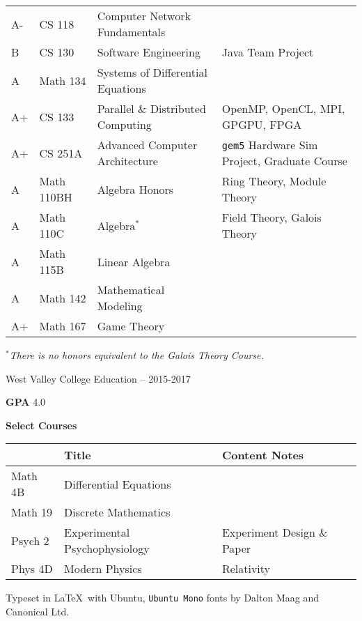 \documentclass[11pt]{article}
\newcommand{\myTitle}[1]{{ \vspace{2mm} \LARGE \color{titleColor} \textsf{#1}\vspace{2mm}}}
\newcommand{\myKey}[1]{{\color{keyColor}\textbf{#1}}}
\begin{document}
{\begin{tabular}{l l l l}
\rowcolor{oddColor}
A- & CS 118 & Computer Network Fundamentals & \\
\rowcolor{oddColor}
B  & CS 130 & Software Engineering & Java Team Project \\
\rowcolor{oddColor}
A  & Math 134 & Systems of Differential Equations & \\

\rowcolor{evenColor}
A+ & CS 133 & Parallel \& Distributed Computing & OpenMP, OpenCL, MPI, GPGPU, FPGA \\
\rowcolor{evenColor}
A+ & CS 251A & Advanced Computer Architecture & \texttt{gem5} Hardware Sim Project, Graduate Course \\
\rowcolor{evenColor}
A  & Math 110BH & Algebra Honors & Ring Theory, Module Theory \\

\rowcolor{oddColor}
A  & Math 110C & Algebra\( ^* \) & Field Theory, Galois Theory \\
\rowcolor{oddColor}
A  & Math 115B & Linear Algebra & \\

\rowcolor{evenColor}
A & Math 142 & Mathematical Modeling & \\
\rowcolor{evenColor}
A+ & Math 167 & Game Theory & \\
\hline
\end{tabular}
}

\textit{\( ^* \)There is no honors equivalent to the Galois Theory Course.}

\myTitle{West Valley College Education -- 2015-2017}

\myKey{GPA} 4.0

\myKey{Select Courses}

\begin{tabular}{l l l}
\hline
 & Title & Content Notes \\
\hline
\rowcolor{oddColor} Math 4B & Differential Equations & \\
\rowcolor{oddColor} Math 19 & Discrete Mathematics & \\
\rowcolor{oddColor}
Psych 2 & Experimental Psychophysiology & Experiment Design \& Paper \\
\rowcolor{oddColor} Phys 4D & Modern Physics & Relativity \\
\hline
\end{tabular}

\vspace{10mm}
{
\begin{center}
\color{gray}
Typeset in \LaTeX\ with \textsf{Ubuntu}, \texttt{Ubuntu Mono} fonts by
Dalton Maag and Canonical Ltd.
\end{center}
}
\end{document}

